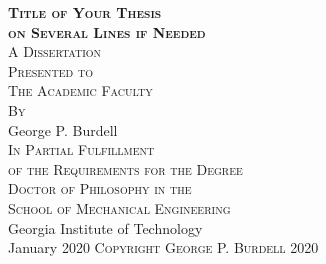 
\newcommand{\thesisTitle}{Title of Your Thesis\\on Several Lines if Needed}
\newcommand{\yourName}{George P. Burdell}
\newcommand{\yourSchool}{Mechanical Engineering}
\newcommand{\yourMonth}{January}
\newcommand{\yourYear}{2020}


\begin{titlepage}
\begin{center}

\begin{singlespacing}

{\Large\textbf{\textsc{\thesisTitle}}}\\
\vspace{10\baselineskip}
{\footnotesize \textsc{A Dissertation}}\\
{\footnotesize \textsc{Presented to}}\\
{\footnotesize \textsc{The Academic Faculty}}\\
\vspace{2\baselineskip}
{\footnotesize \textsc{By}}\\
\vspace{2\baselineskip}
\large\yourName\\
\vspace{2\baselineskip}
{\footnotesize \textsc{In Partial Fulfillment}}\\
{\footnotesize \textsc{of the Requirements for the Degree}}\\
{\footnotesize \textsc{Doctor of Philosophy in the}}\\
{\footnotesize \textsc{School of \yourSchool}}\\
\vspace{2\baselineskip}
{\large Georgia Institute of Technology}\\
\vspace{\baselineskip}
{\large \yourMonth{} \yourYear{}}
\vfill
\normalsize{\textsc{Copyright \textcopyright{} \yourName{} \yourYear{}}}
\vspace{\baselineskip}

\end{singlespacing}

\end{center}
\end{titlepage}


